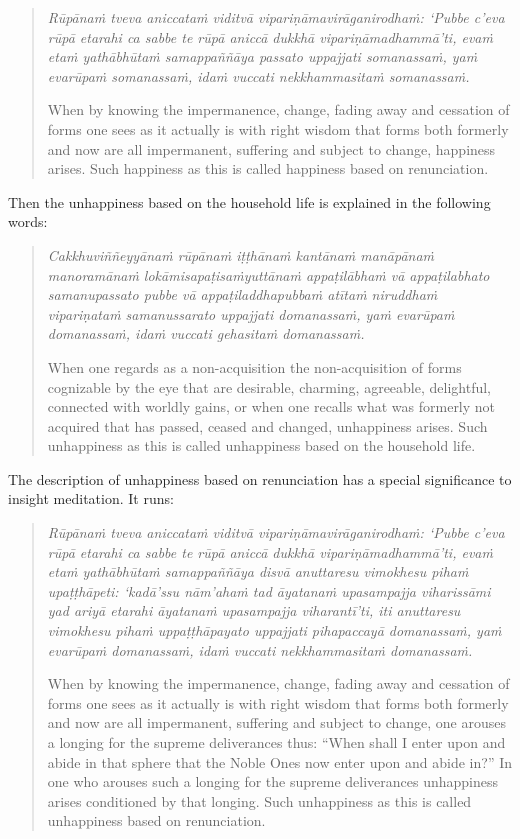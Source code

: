 \begin{quote}
\emph{Rūpānaṁ tveva aniccataṁ viditvā vipariṇāmavirāganirodhaṁ: `Pubbe c'eva rūpā etarahi ca sabbe te rūpā aniccā dukkhā vipariṇāmadhammā'ti, evaṁ etaṁ yathābhūtaṁ samappaññāya passato uppajjati somanassaṁ, yaṁ evarūpaṁ somanassaṁ, idaṁ vuccati nekkhammasitaṁ somanassaṁ.}

When by knowing the impermanence, change, fading away and cessation of forms one sees as it actually is with right wisdom that forms both formerly and now are all impermanent, suffering and subject to change, happiness arises. Such happiness as this is called happiness based on renunciation.
\end{quote}

Then the unhappiness based on the household life is explained in the following words:

\begin{quote}
\emph{Cakkhuviññeyyānaṁ rūpānaṁ iṭṭhānaṁ kantānaṁ manāpānaṁ manoramānaṁ lokāmisapaṭisaṁyuttānaṁ appaṭilābhaṁ vā appaṭilabhato samanupassato pubbe vā appaṭiladdhapubbaṁ atītaṁ niruddhaṁ vipariṇataṁ samanussarato uppajjati domanassaṁ, yaṁ evarūpaṁ domanassaṁ, idaṁ vuccati gehasitaṁ domanassaṁ.}

When one regards as a non-acquisition the non-acquisition of forms cognizable by the eye that are desirable, charming, agreeable, delightful, connected with worldly gains, or when one recalls what was formerly not acquired that has passed, ceased and changed, unhappiness arises. Such unhappiness as this is called unhappiness based on the household life.
\end{quote}

The description of unhappiness based on renunciation has a special significance to insight meditation. It runs:

\begin{quote}
\emph{Rūpānaṁ tveva aniccataṁ viditvā vipariṇāmavirāganirodhaṁ: `Pubbe c'eva rūpā etarahi ca sabbe te rūpā aniccā dukkhā vipariṇāmadhammā'ti, evaṁ etaṁ yathābhūtaṁ samappaññāya disvā anuttaresu vimokhesu pihaṁ upaṭṭhāpeti: `kadā'ssu nām'ahaṁ tad āyatanaṁ upasampajja viharissāmi yad ariyā etarahi āyatanaṁ upasampajja viharantī'ti, iti anuttaresu vimokhesu pihaṁ uppaṭṭhāpayato uppajjati pihapaccayā domanassaṁ, yaṁ evarūpaṁ domanassaṁ, idaṁ vuccati nekkhammasitaṁ domanassaṁ.}

When by knowing the impermanence, change, fading away and cessation of forms one sees as it actually is with right wisdom that forms both formerly and now are all impermanent, suffering and subject to change, one arouses a longing for the supreme deliverances thus: ``When shall I enter upon and abide in that sphere that the Noble Ones now enter upon and abide in?'' In one who arouses such a longing for the supreme deliverances unhappiness arises conditioned by that longing. Such unhappiness as this is called unhappiness based on renunciation.
\end{quote}

